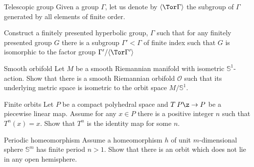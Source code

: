 \begin{pr}{}{Telescopic group}
Given a group $\Gamma$, let us denote by $\langle\Tor\Gamma\rangle$ the subgroup of $\Gamma$ generated by all elements of finite order.

Construct a finitely presented hyperbolic group, $\Gamma$ such that for any finitely presented group $G$ there is a subgroup $\Gamma'<\Gamma$ of finite index such that 
$G$ is isomorphic to the factor group $\Gamma'/\langle\Tor\Gamma'\rangle$
\end{pr}



\begin{pr}{}{Smooth orbifold}\label{Smooth orbifold}
Let $M$ be a smooth Riemannian manifold with isometric 
$\mathbb{S}^1$-action.
Show that there is a smooth Riemannian orbifold $\mathcal{O}$
such that its underlying metric space 
is isometric to the orbit space $M/\mathbb{S}^1$.
\end{pr}


\begin{pr}{}{Finite orbits}\label{Finite orbits}
Let $P$ be a compact polyhedral space and $T\:P\z\to P$ be a piecewise linear map.
Assume for any $x\in P$ there is a positive integer $n$ such that
$T^n(x)=x$.
Show that $T^n$ is the identity map for some $n$. 
\end{pr}

\begin{pr}{\easy}{Periodic homeomorphism}\label{Finite action}
Assume a homeomorphism $h$ of unit $m$-dimensional sphere $\mathbb S^m$ has  finite period $n>1$.
Show that there is an orbit which does not lie in any open hemisphere.
\end{pr}
